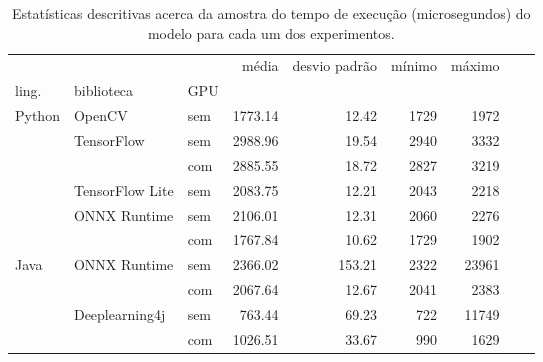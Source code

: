 \begin{table}
  \centering
  \begin{tabular}{lllrrrrrr}
    \toprule
           &                 &     & média   & desvio padrão & mínimo & máximo \\
    ling.  & biblioteca      & GPU &         &               &        &        \\
    \midrule
    Python & OpenCV          & sem & 1773.14 & 12.42         & 1729   & 1972   \\
           & TensorFlow      & sem & 2988.96 & 19.54         & 2940   & 3332   \\
           &                 & com & 2885.55 & 18.72         & 2827   & 3219   \\
           & TensorFlow Lite & sem & 2083.75 & 12.21         & 2043   & 2218   \\
           & ONNX Runtime    & sem & 2106.01 & 12.31         & 2060   & 2276   \\
           &                 & com & 1767.84 & 10.62         & 1729   & 1902   \\
    Java   & ONNX Runtime    & sem & 2366.02 & 153.21        & 2322   & 23961  \\
           &                 & com & 2067.64 & 12.67         & 2041   & 2383   \\
           & Deeplearning4j  & sem & 763.44  & 69.23         & 722    & 11749  \\
           &                 & com & 1026.51 & 33.67         & 990    & 1629   \\

    \bottomrule
  \end{tabular}
  \caption{Estatísticas descritivas acerca da amostra do tempo de execução (microsegundos) do modelo para cada um dos experimentos.}
  \label{tab:all}
\end{table}

